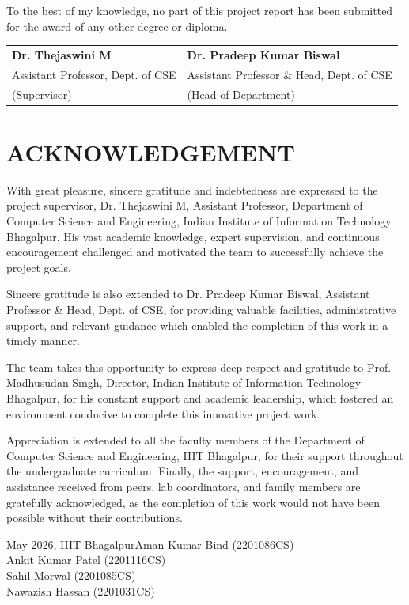 \documentclass[12pt, a4paper]{report}
\newcommand{\departmentMixed}{Department of Computer Science and Engineering}
\newcommand{\instituteMixed}{Indian Institute of Information Technology Bhagalpur}
\newcommand{\instituteShort}{IIIT Bhagalpur}
\newcommand{\submissionMonthYearMixed}{May 2026}
\newcommand{\studentOneName}{Aman Kumar Bind}
\newcommand{\studentOneRoll}{2201086CS}
\newcommand{\studentTwoName}{Ankit Kumar Patel}
\newcommand{\studentTwoRoll}{2201116CS}
\newcommand{\studentThreeName}{Sahil Morwal}
\newcommand{\studentThreeRoll}{2201085CS}
\newcommand{\studentFourName}{Nawazish Hassan}
\newcommand{\studentFourRoll}{2201031CS}
\newcommand{\supervisorName}{Dr. Thejaswini M}
\newcommand{\supervisorDesignation}{Assistant Professor}
\newcommand{\hodName}{Dr. Pradeep Kumar Biswal}
\newcommand{\hodDesignation}{Assistant Professor \& Head, Dept. of CSE}
\newcommand{\directorName}{Prof. Madhusudan Singh}
\begin{document}
To the best of my knowledge, no part of this project report has been submitted for the award of any other degree or diploma.

\vspace{2cm}

\noindent
\begin{tabular}{p{7cm}p{7cm}}
\textbf{\supervisorName} & \textbf{\hodName}\\
\supervisorDesignation, Dept. of CSE &
\hodDesignation\\
(Supervisor) & (Head of Department)
\end{tabular}

\chapter*{ACKNOWLEDGEMENT}
With great pleasure, sincere gratitude and indebtedness are expressed to the project supervisor, \supervisorName, \supervisorDesignation, \departmentMixed, \instituteMixed. His vast academic knowledge, expert supervision, and continuous encouragement challenged and motivated the team to successfully achieve the project goals. 

Sincere gratitude is also extended to \hodName, \hodDesignation, for providing valuable facilities, administrative support, and relevant guidance which enabled the completion of this work in a timely manner.

The team takes this opportunity to express deep respect and gratitude to \directorName, Director, \instituteMixed, for his constant support and academic leadership, which fostered an environment conducive to complete this innovative project work.

Appreciation is extended to all the faculty members of the \departmentMixed, \instituteShort, for their support throughout the undergraduate curriculum. Finally, the support, encouragement, and assistance received from peers, lab coordinators, and family members are gratefully acknowledged, as the completion of this work would not have been possible without their contributions.

\vspace{1cm}
\noindent \submissionMonthYearMixed, \instituteShort \hfill \studentOneName{} (\studentOneRoll)\\
\null \hfill \studentTwoName{} (\studentTwoRoll)\\
\null \hfill \studentThreeName{} (\studentThreeRoll)\\
\null \hfill \studentFourName{} (\studentFourRoll)
\end{document}
